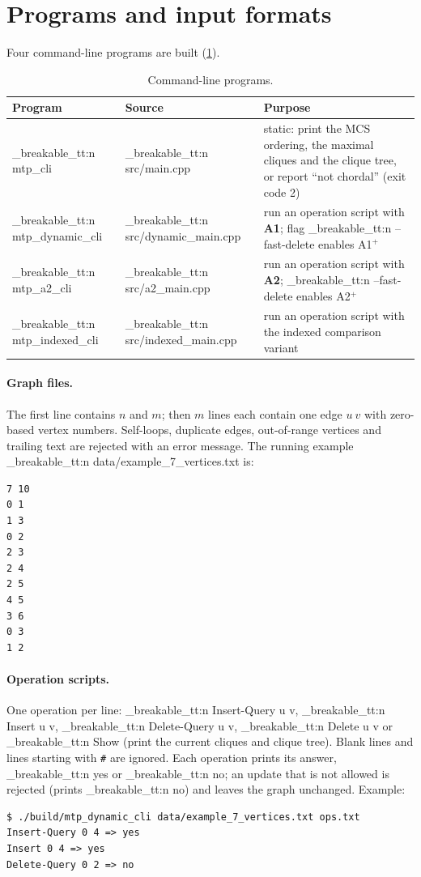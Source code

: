 \documentclass[11pt,a4paper,oneside]{report}
\theoremstyle{plain}
\theoremstyle{definition}
\theoremstyle{remark}
\DeclareRobustCommand{\code}[1]{\mtp_breakable_tt:n {#1}}
\DeclareRobustCommand{\file}[1]{\mtp_breakable_tt:n {#1}}
\begin{document}
\section{Programs and input formats}\label{sec:programs}
Four command-line programs are built (\cref{tab:clis}).

\begin{table}[ht]
\centering\small
\caption{Command-line programs.}\label{tab:clis}
\begin{tabularx}{\textwidth}{@{}llX@{}}
\toprule
\textbf{Program} & \textbf{Source} & \textbf{Purpose}\\
\midrule
\code{mtp_cli} & \file{src/main.cpp} & static: print the MCS ordering, the maximal cliques and the clique tree, or report ``not chordal'' (exit code 2)\\
\code{mtp_dynamic_cli} & \file{src/dynamic_main.cpp} & run an operation script with \textbf{A1}; flag \code{--fast-delete} enables A1\(^+\)\\
\code{mtp_a2_cli} & \file{src/a2_main.cpp} & run an operation script with \textbf{A2}; \code{--fast-delete} enables A2\(^+\)\\
\code{mtp_indexed_cli} & \file{src/indexed_main.cpp} & run an operation script with the indexed comparison variant\\
\bottomrule
\end{tabularx}
\end{table}

\paragraph{Graph files.} The first line contains \(n\) and \(m\); then \(m\) lines each contain
one edge \(u\ v\) with zero-based vertex numbers. Self-loops, duplicate edges, out-of-range
vertices and trailing text are rejected with an error message. The running example
\file{data/example_7_vertices.txt} is:
\begin{lstlisting}[style=shell]
7 10
0 1
1 3
0 2
2 3
2 4
2 5
4 5
3 6
0 3
1 2
\end{lstlisting}

\paragraph{Operation scripts.} One operation per line: \code{Insert-Query u v},
\code{Insert u v}, \code{Delete-Query u v}, \code{Delete u v} or \code{Show} (print the current
cliques and clique tree). Blank lines and lines starting with \texttt{\#} are ignored. Each
operation prints its answer, \code{yes} or \code{no}; an update that is not allowed is
rejected (prints \code{no}) and leaves the graph unchanged. Example:
\begin{lstlisting}[style=shell]
$ ./build/mtp_dynamic_cli data/example_7_vertices.txt ops.txt
Insert-Query 0 4 => yes
Insert 0 4 => yes
Delete-Query 0 2 => no
\end{lstlisting}
\end{document}
